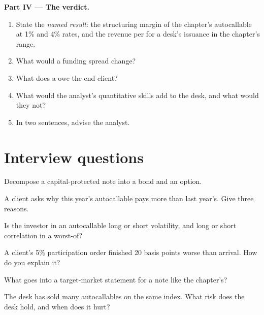 \begin{problem}
\medskip\noindent\textbf{Part IV --- The verdict.}
\begin{enumerate}[resume]
\item State the \emph{named result}: the structuring margin of the chapter's autocallable at 1\% and 4\% rates, and the
revenue per  for a desk's issuance in the chapter's range.
\item What would a funding spread change?
\item What does a  owe the end client?
\item What would the analyst's quantitative skills add to the desk, and what would they not?
\item In two sentences, advise the analyst.
\end{enumerate}
\end{problem}

\section{Interview questions}

\begin{interviewq}\label{iq:in:structurer-sales-and-sales-trader:1}
Decompose a capital-protected note into a bond and an option.
\end{interviewq}

\begin{interviewq}\label{iq:in:structurer-sales-and-sales-trader:2}
A client asks why this year's autocallable pays more than last year's. Give three reasons.
\end{interviewq}

\begin{interviewq}\label{iq:in:structurer-sales-and-sales-trader:3}
Is the investor in an autocallable long or short volatility, and long or short correlation in a worst-of?
\end{interviewq}

\begin{interviewq}\label{iq:in:structurer-sales-and-sales-trader:4}
A client's 5\% participation order finished 20 basis points worse than arrival. How do you explain it?
\end{interviewq}

\begin{interviewq}\label{iq:in:structurer-sales-and-sales-trader:5}
What goes into a target-market statement for a note like the chapter's?
\end{interviewq}

\begin{interviewq}\label{iq:in:structurer-sales-and-sales-trader:6}
The desk has sold many autocallables on the same index. What risk does the desk hold, and when does it hurt?
\end{interviewq}
